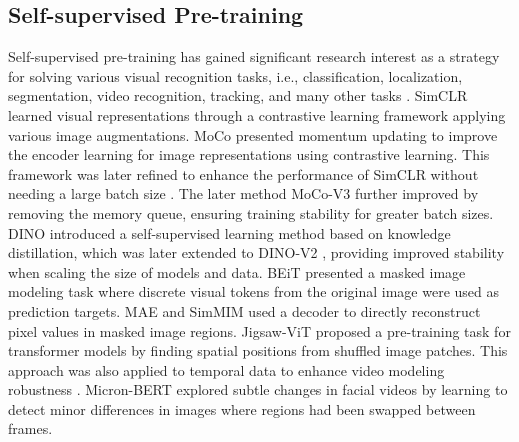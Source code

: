 \subsection{Self-supervised Pre-training}

Self-supervised pre-training has gained significant research interest as a strategy for solving various visual recognition tasks, i.e., classification, localization, segmentation, video recognition, tracking, and many other tasks \cite{he2022masked, truong2022direcformer, nguyen2021clusformer, truong2021bimal, truong2024fairness, truong2023fredom, truong2023liaad,nguyen2023brainformer,nguyen2023fairness,sefl_supervised_medical,nguyen2023micron,nguyen2022two}.
SimCLR \cite{chen2020simple} learned visual representations through a contrastive learning framework applying various image augmentations.
MoCo \cite{he2020momentum} presented momentum updating to improve the encoder learning for image representations using contrastive learning. 
This framework was later refined to enhance the performance of SimCLR without needing a large batch size \cite{chen2020improved}.
The later method MoCo-V3 \cite{chen2021empirical} further improved by removing the memory queue, ensuring training stability for greater batch sizes.
DINO \cite{caron2021emerging} introduced a self-supervised learning method based on knowledge distillation, which was later extended to DINO-V2 \cite{oquab2023dinov2}, providing improved stability when scaling the size of models and data.
BEiT \cite{bao2021beit} presented a masked image modeling task where discrete visual tokens from the original image were used as prediction targets.
MAE \cite{he2022masked} and SimMIM \cite{xie2022simmim} used a decoder to directly reconstruct pixel values in masked image regions. 
Jigsaw-ViT \cite{chen2023jigsaw} proposed a pre-training task for transformer models by finding spatial positions from shuffled image patches.
This approach was also applied to temporal data to enhance video modeling robustness \cite{truong2022direcformer}.
Micron-BERT \cite{nguyen2023micron} explored subtle changes in facial videos by learning to detect minor differences in images where regions had been swapped between frames.

